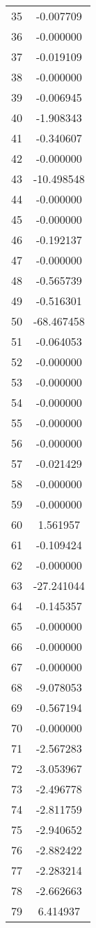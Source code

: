 \documentclass[12pt]{article}
\begin{document}
\begin{longtable}{@{}cc@{}}
35 & -0.007709 \\
36 & -0.000000 \\
37 & -0.019109 \\
38 & -0.000000 \\
39 & -0.006945 \\
40 & -1.908343 \\
41 & -0.340607 \\
42 & -0.000000 \\
43 & -10.498548 \\
44 & -0.000000 \\
45 & -0.000000 \\
46 & -0.192137 \\
47 & -0.000000 \\
48 & -0.565739 \\
49 & -0.516301 \\
50 & -68.467458 \\
51 & -0.064053 \\
52 & -0.000000 \\
53 & -0.000000 \\
54 & -0.000000 \\
55 & -0.000000 \\
56 & -0.000000 \\
57 & -0.021429 \\
58 & -0.000000 \\
59 & -0.000000 \\
60 & 1.561957 \\
61 & -0.109424 \\
62 & -0.000000 \\
63 & -27.241044 \\
64 & -0.145357 \\
65 & -0.000000 \\
66 & -0.000000 \\
67 & -0.000000 \\
68 & -9.078053 \\
69 & -0.567194 \\
70 & -0.000000 \\
71 & -2.567283 \\
72 & -3.053967 \\
73 & -2.496778 \\
74 & -2.811759 \\
75 & -2.940652 \\
76 & -2.882422 \\
77 & -2.283214 \\
78 & -2.662663 \\
79 & 6.414937 \\

\end{longtable}
\end{document}
